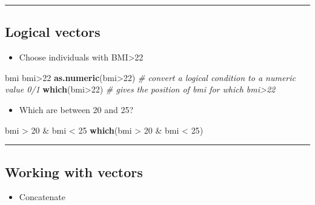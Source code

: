 \documentclass[]{article}
\def\tightlist{}
\newenvironment{Shaded}{\begin{snugshade}}{\end{snugshade}}
\newcommand{\KeywordTok}[1]{\textcolor[rgb]{0.13,0.29,0.53}{\textbf{{#1}}}}
\newcommand{\DecValTok}[1]{\textcolor[rgb]{0.00,0.00,0.81}{{#1}}}
\newcommand{\StringTok}[1]{\textcolor[rgb]{0.31,0.60,0.02}{{#1}}}
\newcommand{\CommentTok}[1]{\textcolor[rgb]{0.56,0.35,0.01}{\textit{{#1}}}}
\newcommand{\NormalTok}[1]{{#1}}
\numberwithin{equation}{section}
\begin{document}
\begin{center}\rule{0.5\linewidth}{\linethickness}\end{center}

\subsection{Logical vectors}\label{logical-vectors}

\begin{itemize}
\tightlist
\item
  Choose individuals with BMI\textgreater{}22
\end{itemize}

\begin{Shaded}
\begin{Highlighting}[]
\NormalTok{bmi}
\NormalTok{bmi>}\DecValTok{22}
\KeywordTok{as.numeric}\NormalTok{(bmi>}\DecValTok{22}\NormalTok{) }\CommentTok{# convert a logical condition to a numeric value 0/1}
\KeywordTok{which}\NormalTok{(bmi>}\DecValTok{22}\NormalTok{)  }\CommentTok{# gives the position of bmi for which bmi>22}
\end{Highlighting}
\end{Shaded}

\begin{itemize}
\tightlist
\item
  Which are between 20 and 25?
\end{itemize}

\begin{Shaded}
\begin{Highlighting}[]
\NormalTok{bmi >}\StringTok{ }\DecValTok{20} \NormalTok{&}\StringTok{ }\NormalTok{bmi <}\StringTok{ }\DecValTok{25}
\KeywordTok{which}\NormalTok{(bmi >}\StringTok{ }\DecValTok{20} \NormalTok{&}\StringTok{ }\NormalTok{bmi <}\StringTok{ }\DecValTok{25}\NormalTok{)}
\end{Highlighting}
\end{Shaded}

\begin{center}\rule{0.5\linewidth}{\linethickness}\end{center}

\subsection{Working with vectors}\label{working-with-vectors}

\begin{itemize}
\tightlist
\item
  Concatenate
\end{itemize}
\end{document}
